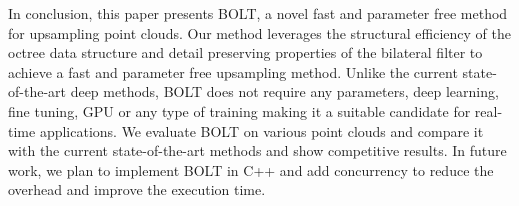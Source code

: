 In conclusion, this paper presents BOLT, a novel fast and parameter free method for upsampling point clouds.
Our method leverages the structural efficiency of the octree data structure and detail preserving properties of the bilateral filter to achieve a fast and parameter free upsampling method.
Unlike the current state-of-the-art deep methods, BOLT does not require any parameters, deep learning, fine tuning, GPU or any type of training making it a suitable candidate for real-time applications.
We evaluate BOLT on various point clouds and compare it with the current state-of-the-art methods and show competitive results.
In future work, we plan to implement BOLT in C++ and add concurrency to reduce the overhead and improve the execution time.
